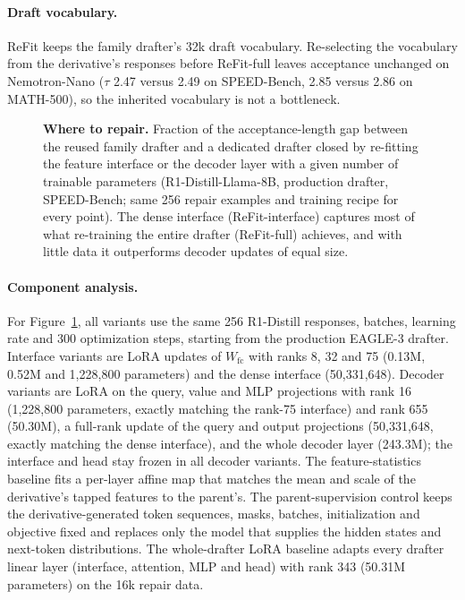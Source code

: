\documentclass[11pt]{article}
\newcommand{\refit}{ReFit}
\newcommand{\refitI}{ReFit-interface}
\newcommand{\refitF}{ReFit-full}
\begin{document}
\paragraph{Draft vocabulary.}
\refit{} keeps the family drafter's 32k draft vocabulary.
Re-selecting the vocabulary from the derivative's responses before \refitF{} leaves acceptance unchanged on Nemotron-Nano ($\tau$ 2.47 versus 2.49 on SPEED-Bench, 2.85 versus 2.86 on MATH-500), so the inherited vocabulary is not a bottleneck.

\begin{figure}[h]
  \centering
  
  \caption{\textbf{Where to repair.} Fraction of the acceptance-length gap between the reused family drafter and a dedicated drafter closed by re-fitting the feature interface or the decoder layer with a given number of trainable parameters (R1-Distill-Llama-8B, production drafter, SPEED-Bench; same 256 repair examples and training recipe for every point). The dense interface (\refitI{}) captures most of what re-training the entire drafter (\refitF{}) achieves, and with little data it outperforms decoder updates of equal size.}
  \label{fig:components}
\end{figure}

\paragraph{Component analysis.}
For Figure~\ref{fig:components}, all variants use the same 256 R1-Distill responses, batches, learning rate and 300 optimization steps, starting from the production EAGLE-3 drafter.
Interface variants are LoRA updates of $W_{\text{fc}}$ with ranks 8, 32 and 75 (0.13M, 0.52M and 1,228,800 parameters) and the dense interface (50,331,648).
Decoder variants are LoRA on the query, value and MLP projections with rank 16 (1,228,800 parameters, exactly matching the rank-75 interface) and rank 655 (50.30M), a full-rank update of the query and output projections (50,331,648, exactly matching the dense interface), and the whole decoder layer (243.3M); the interface and head stay frozen in all decoder variants.
The feature-statistics baseline fits a per-layer affine map that matches the mean and scale of the derivative's tapped features to the parent's.
The parent-supervision control keeps the derivative-generated token sequences, masks, batches, initialization and objective fixed and replaces only the model that supplies the hidden states and next-token distributions.
The whole-drafter LoRA baseline adapts every drafter linear layer (interface, attention, MLP and head) with rank 343 (50.31M parameters) on the 16k repair data.
\end{document}
